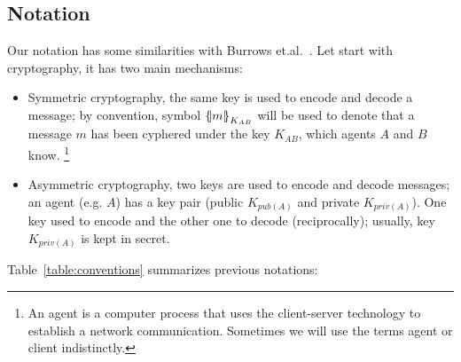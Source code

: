\subsection{Notation}

Our notation has some similarities with Burrows et.al.~\cite{Burrows1990}. Let start with
cryptography, it has two main mechanisms:
\begin{itemize}
  \item Symmetric cryptography, the same key is used to encode and
    decode a message; by convention, symbol $\fat{m}_{K_{AB}}$ will be
    used to denote that a message $m$ has been cyphered under the key
    $K_{AB}$, which agents $A$ and $B$ know. \footnote{An agent is a 
        computer process that uses the client-server technology to 
        establish a network communication. Sometimes we will use the 
        terms agent or client indistinctly.} 
  \item Asymmetric cryptography, two keys are used to encode and
    decode messages; an agent (e.g. $A$) has a key pair
    (public $K_{pub(A)}$ and private $K_{priv(A)}$). One key used to
    encode and the other one to decode (reciprocally); usually, key
    $K_{priv(A)}$ is kept in secret. 
\end{itemize}
Table~\ref{table:conventions} summarizes previous notations:
